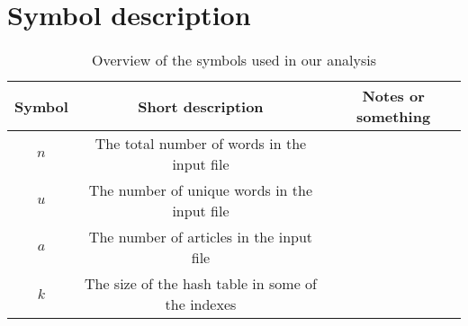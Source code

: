 \section*{Symbol description}

\vfill

\begin{table}[ht!]
    \centering
    \begin{tabular}{c|c|c}
        Symbol & Short description & Notes or something \\\hline
        $n$ & The total number of words in the input file &   \\
        $u$ & The number of unique words in the input file &   \\
        $a$ & The number of articles in the input file &   \\
        $k$ & The size of the hash table in some of the indexes &   \\
    \end{tabular}
    \caption{Overview of the symbols used in our analysis}
    \label{tab:symbol_desc}
\end{table}

\vfill
